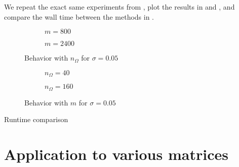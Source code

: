 We repeat the exact same experiments from ,
plot the results in  and
, and compare the wall time
between the methods in .

\begin{figure}[ht]
    \begin{subfigure}[b]{0.49\columnwidth}
        
        \caption{$m=800$}
        \label{fig:5-experiments-haydock-convergence-nv-m800}
    \end{subfigure}
    \begin{subfigure}[b]{0.49\columnwidth}
        
        \caption{$m=2400$}
        \label{fig:5-experiments-haydock-convergence-nv-m2400}
    \end{subfigure}
    \caption{Behavior with $n_{\Omega}$ for $\sigma=0.05$}
    \label{fig:5-experiments-haydock-convergence-nv}
\end{figure}

\begin{figure}[ht]
    \centering
    \begin{subfigure}[b]{0.49\columnwidth}
        
        \caption{$n_{\Omega}=40$}
        \label{fig:5-experiments-haydock-convergence-m-nv40}
    \end{subfigure}
    \begin{subfigure}[b]{0.49\columnwidth}
        
        \caption{$n_{\Omega}=160$}
        \label{fig:5-experiments-haydock-convergence-m-nv160}
    \end{subfigure}
    \caption{Behavior with $m$ for $\sigma=0.05$}
    \label{fig:5-experiments-haydock-convergence-m}
\end{figure}


\begin{table}[ht]
    \caption{Runtime comparison}
    \label{tab:5-experiments-timing-haydock}
   
\end{table}


\section{Application to various matrices}
\label{sec:5-experiments-various-matrices}



%    
